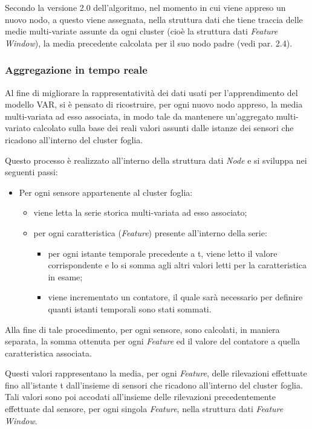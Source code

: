 \documentclass[12pt,a4paper,twoside,openright]{book}
\begin{document}
Secondo la versione 2.0 dell'algoritmo, nel momento in cui viene appreso un nuovo nodo, a questo viene assegnata, nella struttura dati che tiene traccia delle medie multi-variate assunte da ogni cluster (cioè la struttura dati \textit{Feature Window}), la media precedente calcolata per il suo nodo padre (vedi par. 2.4). 

\subsubsection{Aggregazione in tempo reale}
Al fine di migliorare la rappresentatività dei dati usati per l'apprendimento del modello VAR, si è pensato di ricostruire, per ogni nuovo nodo appreso, la media multi-variata ad esso associata, in modo tale da mantenere un'aggregato multi-variato calcolato sulla base dei reali valori assunti dalle istanze dei sensori che ricadono all'interno del cluster foglia.

Questo processo è realizzato all'interno della struttura dati \textit{Node} e si sviluppa nei seguenti passi:
\begin{itemize}
\item Per ogni sensore appartenente al cluster foglia:
\begin{itemize}
\item viene letta la serie storica multi-variata ad esso associato;
\item per ogni caratteristica (\textit{Feature}) presente all'interno della serie:
\begin{itemize}
\item per ogni istante temporale precedente a t, viene letto il valore corrispondente e lo si somma agli altri valori letti per la caratteristica in esame;
\item viene incrementato un contatore, il quale sarà necessario per definire quanti istanti temporali sono stati sommati.
\end{itemize}
\end{itemize}
\end{itemize}

Alla fine di tale procedimento, per ogni sensore, sono calcolati, in maniera separata, la somma ottenuta per ogni \textit{Feature} ed il valore del contatore a quella caratteristica associata.

Questi valori rappresentano la media, per ogni \textit{Feature}, delle rilevazioni effettuate fino all'istante t dall'insieme di sensori che ricadono all'interno del cluster foglia.
Tali valori sono poi accodati all'insieme delle rilevazioni precedentemente effettuate dal sensore, per ogni singola \textit{Feature}, nella struttura dati \textit{Feature Window}. 
\end{document}
